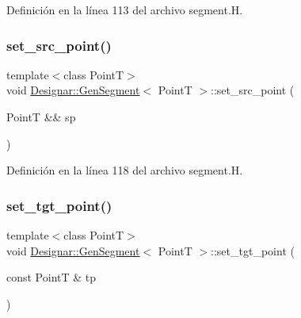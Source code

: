 Definición en la línea 113 del archivo segment.\+H.

\mbox{\label{class_designar_1_1_gen_segment_ace3bf4ead3e970f88cacfa03b4853c3f}} 
\subsubsection{\texorpdfstring{set\+\_\+src\+\_\+point()}{set\_src\_point()}\hspace{0.1cm}{\footnotesize\ttfamily [2/2]}}
{\footnotesize\ttfamily template$<$class PointT$>$ \\
void \hyperlink{class_designar_1_1_gen_segment}{Designar\+::\+Gen\+Segment}$<$ PointT $>$\+::set\+\_\+src\+\_\+point (\begin{DoxyParamCaption}\item[{PointT \&\&}]{sp }\end{DoxyParamCaption})\hspace{0.3cm}{\ttfamily [inline]}}



Definición en la línea 118 del archivo segment.\+H.

\mbox{\label{class_designar_1_1_gen_segment_a3338743508cb033732a3c9ffd4ceb6ea}} 
\subsubsection{\texorpdfstring{set\+\_\+tgt\+\_\+point()}{set\_tgt\_point()}\hspace{0.1cm}{\footnotesize\ttfamily [1/2]}}
{\footnotesize\ttfamily template$<$class PointT$>$ \\
void \hyperlink{class_designar_1_1_gen_segment}{Designar\+::\+Gen\+Segment}$<$ PointT $>$\+::set\+\_\+tgt\+\_\+point (\begin{DoxyParamCaption}\item[{const PointT \&}]{tp }\end{DoxyParamCaption})\hspace{0.3cm}{\ttfamily [inline]}}



